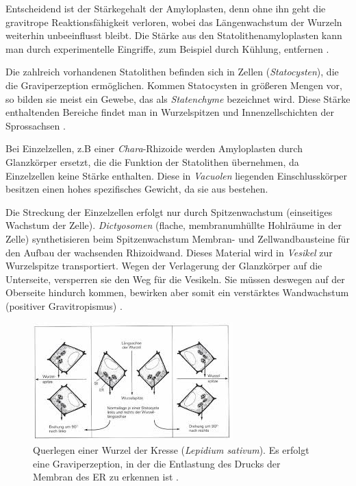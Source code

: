\documentclass[
11pt, 
ngerman,
listof=totocnumbered,
oneside,
bibliography=totocnumbered,
abstracton
]{scrreprt}
\begin{document}
Entscheidend ist der Stärkegehalt der Amyloplasten, denn ohne ihn geht die gravitrope Reaktionsfähigkeit verloren, wobei das Längenwachstum der Wurzeln weiterhin unbeeinflusst bleibt.
Die Stärke aus den Statolithenamyloplasten kann man durch experimentelle Eingriffe, zum Beispiel durch Kühlung, entfernen \parencite[452]{Strasburger}.

Die zahlreich vorhandenen Statolithen befinden sich in Zellen (\emph{Statocysten}), die die Graviperzeption ermöglichen. Kommen Statocysten in größeren Mengen vor, so bilden sie meist ein Gewebe, das als \emph{Statenchyme} bezeichnet wird. Diese Stärke enthaltenden Bereiche findet man in Wurzelspitzen und Innenzellschichten der Sprossachsen \parencite[501--502]{Nultsch}.  


Bei Einzelzellen, z.B einer \emph{Chara}-Rhizoide werden Amyloplasten durch {\glqq Glanzkörper\grqq} ersetzt, die die Funktion der Statolithen übernehmen, da Einzelzellen keine Stärke enthalten. Diese in \emph{Vacuolen} liegenden Einschlusskörper besitzen einen hohes spezifisches Gewicht, da sie aus  bestehen.

Die Streckung der Einzelzellen erfolgt nur durch Spitzenwachstum (einseitiges Wachstum der Zelle).
\emph{Dictyosomen} (flache, membranumhüllte Hohlräume in der Zelle) synthetisieren beim Spitzenwachstum Membran- und Zellwandbausteine für den Aufbau der wachsenden Rhizoidwand. Dieses Material wird in \emph{Vesikel} zur Wurzelspitze transportiert.
Wegen der Verlagerung der {\glqq Glanzkörper\grqq} auf die Unterseite, versperren sie den Weg für die Vesikeln. Sie müssen deswegen auf der Oberseite hindurch kommen, bewirken aber somit ein verstärktes Wandwachstum (positiver Gravitropismus) \parencite[453--454]{Strasburger}.
  
 \begin{figure}[H]
 	\centering 
 	\includegraphics[width = 0.9\linewidth]{images/Graviperzeption.jpeg}
 	\caption{Querlegen einer Wurzel der Kresse (\emph{Lepidium sativum}). Es erfolgt eine Graviperzeption, in der die Entlastung des Drucks der Membran des ER zu erkennen ist \parencite[533]{Luettge}. \label{Graviperzeption}}
 \end{figure} 
 
\end{document}

